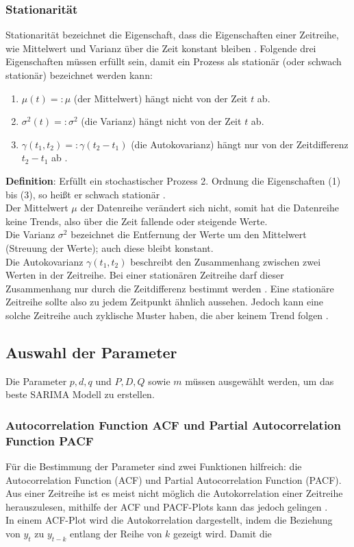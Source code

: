 \documentclass[12pt]{report}
\begin{document}
	\subsubsection{Stationarität}
	Stationarität bezeichnet die Eigenschaft, dass die Eigenschaften einer Zeitreihe, wie Mittelwert und Varianz über die Zeit konstant bleiben \cite[S. 26]{Vogel.2015}.
	Folgende drei Eigenschaften müssen erfüllt sein, damit ein Prozess als stationär (oder schwach stationär) bezeichnet werden kann:
	\begin{enumerate}
		\item \(\mu(t) =: \mu\) (der Mittelwert) hängt nicht von der Zeit \(t\) ab.
		\item \(\sigma^2(t) =: \sigma^2\) (die Varianz) hängt nicht von der Zeit \(t\) ab.
		\item \(\gamma(t_1, t_2) =: \gamma(t_2 - t_1)\) (die Autokovarianz) hängt nur von der Zeitdifferenz \(t_2 - t_1\) ab \cite[S. 26]{Vogel.2015}.
	\end{enumerate}
	\textbf{Definition}: Erfüllt ein stochastischer Prozess 2. Ordnung die Eigenschaften (1) bis (3), so heißt er schwach stationär \cite[S. 26]{Vogel.2015}. \\
	Der Mittelwert $\mu$ der Datenreihe verändert sich nicht, somit hat die Datenreihe keine Trends, also über die Zeit fallende oder steigende Werte. \\
	Die Varianz $\sigma^2$ bezeichnet die Entfernung der Werte um den Mittelwert (Streuung der Werte); auch diese bleibt konstant.\\
	Die Autokovarianz $\gamma(t_1, t_2)$ beschreibt den Zusammenhang zwischen zwei Werten in der Zeitreihe. Bei einer stationären Zeitreihe darf dieser Zusammenhang nur durch die Zeitdifferenz bestimmt werden \cite[S. 26]{Vogel.2015}. 
	Eine stationäre Zeitreihe sollte also zu jedem Zeitpunkt ähnlich aussehen. Jedoch kann eine solche Zeitreihe auch zyklische Muster haben, die aber keinem Trend folgen \cite[Kapitel 8.1]{Hyndman.May2018}.	
	\subsection{Auswahl der Parameter}
	Die Parameter $p, d, q$ und $P, D, Q$ sowie $m$ müssen ausgewählt werden, um das beste SARIMA Modell zu erstellen. 
	
	\subsubsection{Autocorrelation Function ACF und Partial Autocorrelation Function PACF}
	Für die Bestimmung der Parameter sind zwei Funktionen hilfreich: die Autocorrelation Function (ACF) und Partial Autocorrelation Function (PACF). Aus einer Zeitreihe ist es meist nicht möglich die Autokorrelation einer Zeitreihe herauszulesen, mithilfe der ACF und PACF-Plots kann das jedoch gelingen \cite[Kapitel 8.5]{Hyndman.May2018}. \\
	In einem ACF-Plot wird die Autokorrelation dargestellt, indem die Beziehung von $y_t$ zu $y_{t-k}$ entlang der Reihe von $k$ gezeigt wird. Damit die 
	
\end{document}
